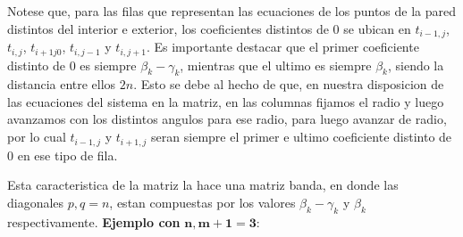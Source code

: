 \medskip
Notese que, para las filas que representan las ecuaciones de los puntos de la pared distintos del interior e exterior, los coeficientes distintos de 0 se ubican en $t_{i-1,j}$, $t_{i,j}$, $t_{i+1j0}$, $t_{i,j-1}$ y $t_{i,j+1}$.
Es importante destacar que el primer coeficiente distinto de 0 es siempre $\beta_{k} - \gamma_{k}$, mientras que el ultimo es siempre $\beta_{k}$, siendo la distancia entre ellos $2n$. Esto se debe al hecho de que, en nuestra disposicion de las ecuaciones del sistema en la matriz,
en las columnas fijamos el radio y luego avanzamos con los distintos angulos para ese radio, para luego avanzar de radio, por lo cual $t_{i-1,j}$ y $t_{i+1,j}$ seran siempre el primer e ultimo coeficiente distinto de 0 en ese tipo de fila.

Esta caracteristica de la matriz la hace una matriz banda, en donde las diagonales $p, q = n$, estan compuestas por los valores $\beta_{k} - \gamma_{k}$ y $\beta_{k}$ respectivamente.
\newline
\newline
\textbf{Ejemplo con} $\bm{n,m+1=3}$:
\begingroup
    \fontsize{8pt}{10pt}\selectfont

